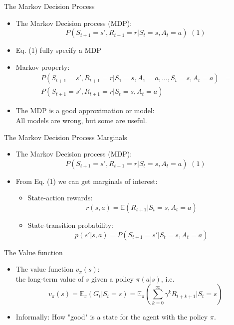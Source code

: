 \documentclass[10pt]{beamer}
\begin{document}
\begin{frame}{The Markov Decision Process}

\begin{itemize}
\item The Markov Decision process (MDP):
\[
P(S_{t+1} = s', R_{t+1} = r| S_t = s, A_t = a)\,\,(1)
\]
\item Eq. (1) {\color{uured}fully specify} a MDP
\pause
\item Markov property:
\begin{align*}
       P(S_{t+1} = s', R_{t+1} = r| S_1 = s, A_1 = a , ..., S_t = s, A_t = a) &  = \\
       P(S_{t+1} = s', R_{t+1} = r| S_t = s, A_t = a) &
\end{align*}
\item The MDP is a good {\color{uured} approximation or model}:\\
      All models are wrong, but some are useful.
\end{itemize}

\end{frame}



\begin{frame}{The Markov Decision Process Marginals}

\begin{itemize}
\item The Markov Decision process (MDP):
\[
P(S_{t+1} = s', R_{t+1} = r| S_t = s, A_t = a)\,\,(1)
\]
\item From Eq. (1) we can get marginals of interest:
\begin{itemize}
\item State-action rewards:
\[
r(s,a) = \mathbb{E}(R_{t+1}|S_t=s, A_t=a)
\]\pause
\item State-transition probability:
\[
p(s'|s,a) = P(S_{t+1}=s'|S_t=s, A_t=a)
\]
\end{itemize}
\end{itemize}

\end{frame}



\begin{frame}{The Value function}

\begin{itemize}
\item The value function $v_{\pi}(s)$: \\the long-term value of $s$ given a policy $\pi(a|s)$, i.e.
\[
v_{\pi}(s) = \mathbb{E}_\pi(G_t|S_t = s) = \mathbb{E}_\pi\left(\sum^\infty_{k=0} \gamma^k R_{t+k+1} | S_t=s \right)
\]
\pause
\item Informally: How "good" is a state for the agent with the policy $\pi$.

\end{itemize}

\end{frame}
\end{document}
